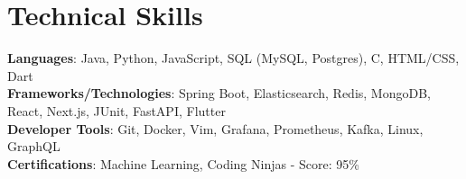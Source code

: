 \documentclass[letterpaper,11pt]{article}
\makeatletter
\newcommand{\resumeItem}[1]{
  \item\small{
    {#1 \vspace{-2pt}}
  }
}
\newcommand{\resumeProjectHeading}[2]{
    \item
    \begin{tabular*}{0.97\textwidth}{l@{\extracolsep{\fill}}r}
      \small#1 & #2 \\
    \end{tabular*}\vspace{-7pt}
}
\newcommand{\resumeSubHeadingListEnd}{\end{itemize}}
\newcommand{\resumeItemListStart}{\begin{itemize}}
\newcommand{\resumeItemListEnd}{\end{itemize}\vspace{-5pt}}
\makeatother
\begin{document}





%
\section{Technical Skills}
\begin{itemize}[leftmargin=0.15in, label={}]
  \small{\item{
        \textbf{Languages}{: Java, Python, JavaScript, SQL (MySQL, Postgres), C, HTML/CSS, Dart} \\
        \textbf{Frameworks/Technologies}{: Spring Boot, Elasticsearch, Redis, MongoDB, React, Next.js, JUnit, FastAPI, Flutter} \\
        \textbf{Developer Tools}{: Git, Docker, Vim, Grafana, Prometheus, Kafka, Linux, GraphQL} \\
        \textbf{Certifications}{: Machine Learning, Coding Ninjas - Score: 95\%}
        }}
\end{itemize}


\end{document}
